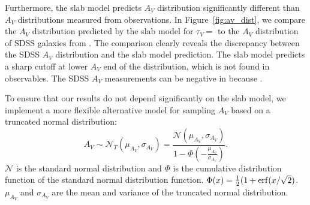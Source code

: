 Furthermore, the slab model predicts $A_V$ distribution significantly different
than $A_V$ distributions measured from observations. In Figure~\ref{fig:av_dist}, we compare the $A_V$
distribution predicted by the slab model for $\tau_V = $ to the $A_V$ 
distribution of SDSS galaxies from \cite{brinchmann2004}. The comparison clearly reveals the
discrepancy between the SDSS $A_V$ distribution and the slab model prediction.
The slab model predicts a sharp cutoff at lower $A_V$ end of the distribution,
which is not found in observables. 
The SDSS $A_V$ measurements can be negative in \cite{brinchmann2004} because 
. 


To ensure that our results do not depend significantly on the slab
model, we implement a more flexible alternative model for sampling $A_V$ based on a
truncated normal distribution: 
\begin{equation}
    A_V \sim \mathcal{N}_T(\mu_{A_V}, \sigma_{A_V}) =
    \frac{\mathcal{N}(\mu_{A_V}, \sigma_{A_V})}{1 -
    \Phi\left(-\frac{\mu_{A_V}}{\sigma_{A_V}}\right)}.
\end{equation}
$\mathcal{N}$ is the standard normal distribution and $\Phi$ is the cumulative
distribution function of the standard normal distribution function.
$\Phi(x) = \frac{1}{2}(1+{\rm erf}(x/\sqrt{2})$. $\mu_{A_V}$ and $\sigma_{A_V}$
are the mean and variance of the truncated normal distribution. 




